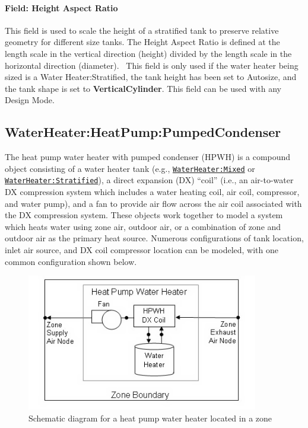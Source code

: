 \paragraph{Field: Height Aspect Ratio}\label{field-height-aspect-ratio}

This field is used to scale the height of a stratified tank to preserve relative geometry for different size tanks. The Height Aspect Ratio is defined at the length scale in the vertical direction (height) divided by the length scale in the horizontal direction (diameter).~ This field is only used if the water heater being sized is a Water Heater:Stratified, the tank height has been set to Autosize, and the tank shape is set to \textbf{VerticalCylinder}. This field can be used with any Design Mode.

\subsection{WaterHeater:HeatPump:PumpedCondenser}\label{waterheaterheatpumppumpedcondenser}

The heat pump water heater with pumped condenser (HPWH) is a compound object consisting of a water heater tank (e.g., \hyperref[waterheatermixed]{\lstinline!WaterHeater:Mixed!} or \hyperref[waterheaterstratified]{\lstinline!WaterHeater:Stratified!}), a direct expansion (DX) ``coil'' (i.e., an air-to-water DX compression system which includes a water heating coil, air coil, compressor, and water pump), and a fan to provide air flow across the air coil associated with the DX compression system. These objects work together to model a system which heats water using zone air, outdoor air, or a combination of zone and outdoor air as the primary heat source. Numerous configurations of tank location, inlet air source, and DX coil compressor location can be modeled, with one common configuration shown below.

\begin{figure}[hbtp] %
\centering
\includegraphics[width=0.9\textwidth, height=0.9\textheight, keepaspectratio=true]{media/image192.png}
\caption{Schematic diagram for a heat pump water heater located in a zone \protect \label{fig:schematic-diagram-for-a-heat-pump-water}}
\end{figure}

